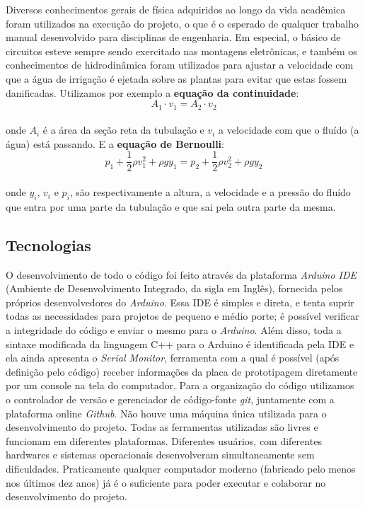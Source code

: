\documentclass[a4paper,12pt]{article}
\begin{document}
Diversos conhecimentos gerais de física adquiridos ao longo da vida acadêmica foram utilizados na execução do projeto, o que é o esperado de qualquer trabalho manual desenvolvido para disciplinas de engenharia. Em especial, o básico de circuitos esteve sempre sendo exercitado nas montagens eletrônicas, e também os conhecimentos de hidrodinâmica foram utilizados para ajustar a velocidade com que a água de irrigação é ejetada sobre as plantas para evitar que estas fossem danificadas. Utilizamos por exemplo a \textbf{equação da continuidade}:
\begin{equation}
A_{1} \cdot v_{1} = A_{2} \cdot v_{2}
\end{equation}
\\ onde $A_{i}$ é a área da seção reta da tubulação e $v_{i}$ a velocidade com que o fluído (a água) está passando. E a \textbf{equação de Bernoulli}:
\begin{equation}
p_{1} + \frac{1}{2}  \rho  v_{1}^{2} + \rho  g  y_{1} = p_{2} + \frac{1}{2}  \rho  v_{2}^{2} + \rho  g  y_{2}
\end{equation}
\\ onde $y_{i}$, $v_{i}$ e $p_{i}$, são respectivamente a altura, a velocidade e a pressão do fluído que entra por uma parte da tubulação e que sai pela outra parte da mesma. \cite{halliday2008ondas}

\subsection{Tecnologias}

O desenvolvimento de todo o código foi feito através da plataforma \textit{Arduino IDE} (Ambiente de Desenvolvimento Integrado, da sigla em Inglês), fornecida pelos próprios desenvolvedores do \textit{Arduino}. Essa IDE é simples e direta, e tenta suprir todas as necessidades para projetos de pequeno e médio porte; é possível verificar a integridade do código e enviar o mesmo para o \textit{Arduino}. Além disso, toda a sintaxe modificada da linguagem C++ para o Arduino é identificada pela IDE e ela ainda apresenta o \textit{Serial Monitor}, ferramenta com a qual é possível (após definição pelo código) receber informações da placa de prototipagem diretamente por um console na tela do computador. Para a organização do código utilizamos o controlador de versão e gerenciador de código-fonte \textit{git}, juntamente com a plataforma online \textit{Github}. Não houve uma máquina única utilizada para o desenvolvimento do projeto. Todas as ferramentas utilizadas são livres e funcionam em diferentes plataformas. Diferentes usuários, com diferentes hardwares e sistemas operacionais desenvolveram simultaneamente sem dificuldades. Praticamente qualquer computador moderno (fabricado pelo menos nos últimos dez anos) já é o suficiente para poder executar e colaborar no desenvolvimento do projeto.
\end{document}
